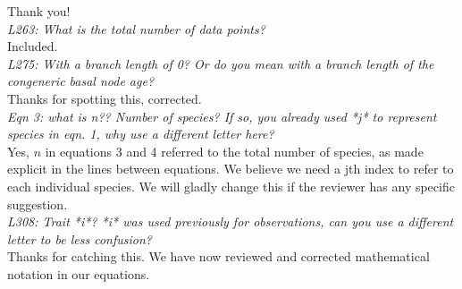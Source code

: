 \documentclass[11pt]{article}
\begin{document}
Thank you!\\ %

\emph{L263: What is the total number of data points?}\\
Included.\\ 

\emph{L275: With a branch length of 0? Or do you mean with a branch length of the congeneric basal node age?}\\
Thanks for spotting this, corrected.\\

\emph{Eqn 3: what is n?? Number of species? If so, you already used *j* to represent species in eqn. 1, why use a different letter here?}\\
Yes, $n$ in equations 3 and 4 referred to the total number of species, as made explicit in the lines between equations. We believe we need a jth index to refer to each individual species. We will gladly change this if the reviewer has any specific suggestion.\\


\emph{L308: Trait *i*? *i* was used previously for observations, can you use a different letter to be less confusion?}\\
Thanks for catching this. We have now reviewed and corrected mathematical notation in our equations.\\



\end{document}
